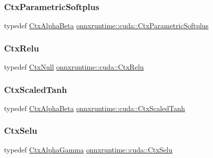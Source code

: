 \subsubsection{\texorpdfstring{Ctx\+Parametric\+Softplus}{CtxParametricSoftplus}}
{\footnotesize\ttfamily typedef \mbox{\hyperlink{structonnxruntime_1_1cuda_1_1CtxAlphaBeta}{Ctx\+Alpha\+Beta}} \mbox{\hyperlink{namespaceonnxruntime_1_1cuda_abc5ef574504b4d7e402dd869c1a002b5}{onnxruntime\+::cuda\+::\+Ctx\+Parametric\+Softplus}}}

\mbox{\label{namespaceonnxruntime_1_1cuda_a705a53af67793b95d33f5dfd89a06e7a}} 
\subsubsection{\texorpdfstring{Ctx\+Relu}{CtxRelu}}
{\footnotesize\ttfamily typedef \mbox{\hyperlink{structonnxruntime_1_1cuda_1_1CtxNull}{Ctx\+Null}} \mbox{\hyperlink{namespaceonnxruntime_1_1cuda_a705a53af67793b95d33f5dfd89a06e7a}{onnxruntime\+::cuda\+::\+Ctx\+Relu}}}

\mbox{\label{namespaceonnxruntime_1_1cuda_ad90c16faed76c8817eace65fa0606cbc}} 
\subsubsection{\texorpdfstring{Ctx\+Scaled\+Tanh}{CtxScaledTanh}}
{\footnotesize\ttfamily typedef \mbox{\hyperlink{structonnxruntime_1_1cuda_1_1CtxAlphaBeta}{Ctx\+Alpha\+Beta}} \mbox{\hyperlink{namespaceonnxruntime_1_1cuda_ad90c16faed76c8817eace65fa0606cbc}{onnxruntime\+::cuda\+::\+Ctx\+Scaled\+Tanh}}}

\mbox{\label{namespaceonnxruntime_1_1cuda_a8bcf7930a730bb8c13757ea4ae88a908}} 
\subsubsection{\texorpdfstring{Ctx\+Selu}{CtxSelu}}
{\footnotesize\ttfamily typedef \mbox{\hyperlink{structonnxruntime_1_1cuda_1_1CtxAlphaGamma}{Ctx\+Alpha\+Gamma}} \mbox{\hyperlink{namespaceonnxruntime_1_1cuda_a8bcf7930a730bb8c13757ea4ae88a908}{onnxruntime\+::cuda\+::\+Ctx\+Selu}}}

